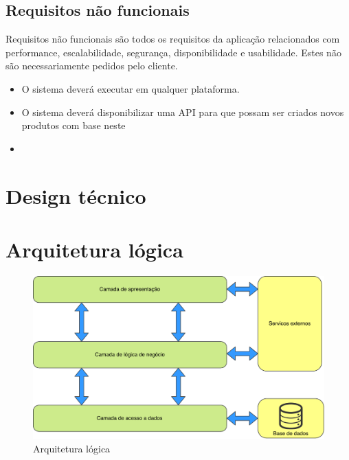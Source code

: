 \subsection{Requisitos não funcionais}


Requisitos não funcionais são todos os requisitos da aplicação relacionados com
performance, escalabilidade, segurança, disponibilidade e usabilidade. Estes não são
necessariamente pedidos pelo cliente. 


\begin{itemize}
	\item O sistema deverá executar em qualquer plataforma.
	
	\item O sistema deverá disponibilizar uma API para que possam ser criados novos produtos com base neste 
	
	\item 
	
\end{itemize}







\section{Design técnico}


\newpage
\section{Arquitetura lógica}



\begin{figure}[!htb]
	\centering
	\includegraphics[width=\linewidth]{esquemas/arquitetura-logica.pdf}
	\caption{Arquitetura lógica}
	\label{opencvlogo}
\end{figure}



